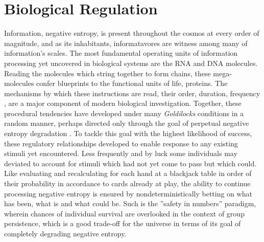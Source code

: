 
\section{Biological Regulation}
\label{sec:bioreg}
Information, \ie negative entropy, is present throughout the cosmos at every order of magnitude, and as its inhabitants, informatavores are witness among many of information's scales. The most fundamental operating units of information processing yet uncovered in biological systems are the RNA and DNA molecules. Reading the molecules which string together to form chains, these mega-molecules confer blueprints to the functional units of life, proteins. The mechanisms by which these instructions are read, \eg their order, duration, frequency \etc, are a major component of modern biological investigation. Together, these procedural tendencies have developed under many \emph{Goldilocks} conditions in a random manner, perhaps directed only through the goal of perpetual negative entropy degradation \citep{england2013statistical}. To tackle this goal with the highest likelihood of success, these regulatory relationships developed to enable response to any existing stimuli yet encountered. Less frequently and by luck some individuals may deviated to account for stimuli which had not yet come to pass but which could. Like evaluating and recalculating for each hand at a blackjack table in order of their probability in accordance to cards already at play, the ability to continue processing negative entropy is ensured by nondeterministically betting on what has been, what is and what could be. Such is the ''safety in numbers'' paradigm, wherein chances of individual survival are overlooked in the context of group persistence, which is a good trade-off for the universe in terms of its goal of completely degrading negative entropy.

